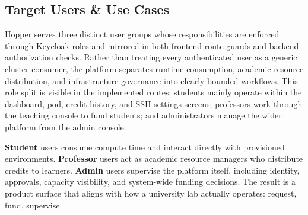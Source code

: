 \documentclass[12pt,a4paper]{article}
\begin{document}
\subsection{Target Users \& Use Cases}
Hopper serves three distinct user groups whose responsibilities are enforced through Keycloak roles and mirrored in both frontend route guards and backend authorization checks. Rather than treating every authenticated user as a generic cluster consumer, the platform separates runtime consumption, academic resource distribution, and infrastructure governance into clearly bounded workflows. This role split is visible in the implemented routes: students mainly operate within the dashboard, pod, credit-history, and SSH settings screens; professors work through the teaching console to fund students; and administrators manage the wider platform from the admin console.

\begin{tcolorbox}[featurebox,title=Role-Oriented Product Surface]
\small
\textbf{Student} users consume compute time and interact directly with provisioned environments. \textbf{Professor} users act as academic resource managers who distribute credits to learners. \textbf{Admin} users supervise the platform itself, including identity, approvals, capacity visibility, and system-wide funding decisions. The result is a product surface that aligns with how a university lab actually operates: request, fund, supervise.
\end{tcolorbox}
\end{document}
